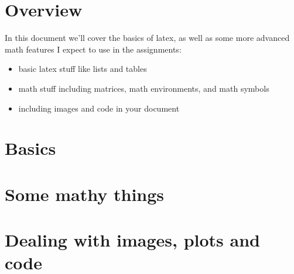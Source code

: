 \documentclass{article}
\begin{document}
\section*{Overview}
In this document we'll cover the basics of latex, as well as some more advanced
math features I expect to use in the assignments:
\begin{itemize}
\item basic latex stuff like lists and tables
\item math stuff including matrices, math environments, and math symbols
\item including images and code in your document
\end{itemize}

\section*{Basics}
\section*{Some mathy things}
\section*{Dealing with images, plots and code}
\end{document}
